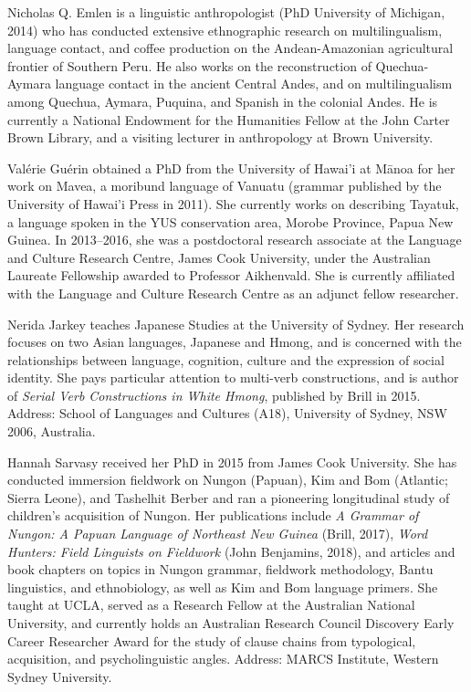 \begin{refsection}
Nicholas Q. Emlen is a linguistic anthropologist (PhD University of Michigan, 2014) who has conducted extensive ethnographic research on multilingualism, language contact, and coffee production on the Andean-Amazonian agricultural frontier of Southern Peru. He also works on the reconstruction of Quechua-Aymara language contact in the ancient Central Andes, and on multilingualism among Quechua, Aymara, Puquina, and Spanish in the colonial Andes. He is currently a National Endowment for the Humanities Fellow at the John Carter Brown Library, and a visiting lecturer in anthropology at Brown University.\linebreak{}

Valérie Guérin obtained a PhD from the University of Hawai'i at Mānoa for her work on Mavea, a moribund language of Vanuatu (grammar published by the University of Hawai'i Press in 2011).  She currently works on describing Tayatuk, a language spoken in the YUS conservation area, Morobe Province, Papua New Guinea. In 2013--2016, she was a postdoctoral research associate at the Language and Culture Research Centre, James Cook University, under the Australian Laureate Fellowship awarded to Professor Aikhenvald. She is currently affiliated with the Language and Culture Research Centre as an adjunct fellow researcher. 

Nerida Jarkey teaches Japanese Studies at the University of Sydney. Her research focuses on two Asian languages, Japanese and Hmong, and is concerned with the relationships between language, cognition, culture and the expression of social identity. She pays particular attention to multi-verb constructions, and is author of \textit{Serial Verb Constructions in White Hmong}, published by Brill in 2015. Address: School of Languages and Cultures (A18), University of Sydney, NSW 2006, Australia.  

Hannah Sarvasy received her PhD in 2015 from James Cook University. She has conducted immersion fieldwork on Nungon (Papuan), Kim and Bom (Atlantic; Sierra Leone), and Tashelhit Berber and ran a pioneering longitudinal study of children’s acquisition of Nungon. Her publications include \textit{A Grammar of Nungon: A Papuan Language of Northeast New Guinea} (Brill, 2017), \textit{Word Hunters: Field Linguists on Fieldwork} (John Benjamins, 2018), and articles and book chapters on topics in Nungon grammar, fieldwork methodology, Bantu linguistics, and ethnobiology, as well as Kim and Bom language primers. She taught at UCLA, served as a Research Fellow at the Australian National University, and currently holds an Australian Research Council Discovery Early Career Researcher Award for the study of clause chains from typological, acquisition, and psycholinguistic angles. Address: MARCS Institute, Western Sydney University. 


{\sloppy
\printbibliography[heading=subbibliography]}
\end{refsection}
